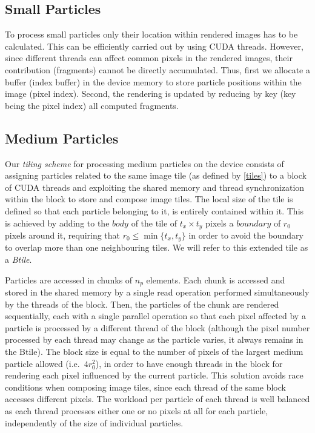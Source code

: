 \documentclass[1p]{elsarticle}
\begin{document}
\subsection{Small Particles}
\label{sec:smallparticles}
To process small particles only their location within rendered images has to be calculated. This can be efficiently carried out by using CUDA threads. However, since different threads can affect common pixels in the rendered images, their contribution (fragments) cannot be directly accumulated. Thus, first we allocate a buffer (index buffer) in the device memory to store particle positions within the image (pixel index). Second, the rendering is updated by reducing by key (key being the pixel index) all computed fragments.

\subsection{Medium Particles}
\label{sec:mediumparticles}
Our \textit{tiling scheme} for processing medium particles on the device consists of assigning particles related to the same image tile (as defined by \eqref{tiles}) to a block of CUDA threads and exploiting the shared memory and thread synchronization within the block to store and compose image tiles. The local size of the tile is defined so that each particle belonging to it, is entirely contained within it. This is achieved by adding to the $body$ of the tile of $t_x \times t_y$ pixels a $boundary$ of $r_0$ pixels around it, requiring that $r_0 \le \min\{t_x, t_y\}$ in order to avoid the boundary to overlap more than one neighbouring tiles. We will refer to this extended tile as a \textit{Btile}.

Particles are accessed in chunks of $n_p$ elements. Each chunk is accessed and stored in the shared memory by a single read operation performed simultaneously by the threads of the block. Then, the particles of the chunk are rendered sequentially, each with a single parallel operation so that each pixel affected by a particle is processed by a different thread of the block (although the pixel number processed by each thread may change as the particle varies, it always remains in the Btile). The block size is equal to the number of pixels of the largest medium particle allowed (i.e.~$4r_0^2$), in order to have enough threads in the block for rendering each pixel influenced by the current particle. 
This solution avoids race conditions when composing image tiles, since each
thread of the same block accesses different pixels. The workload per particle of each
thread is well balanced as each thread processes either one or no pixels at all for each particle, independently of the size of individual particles.
\end{document}
